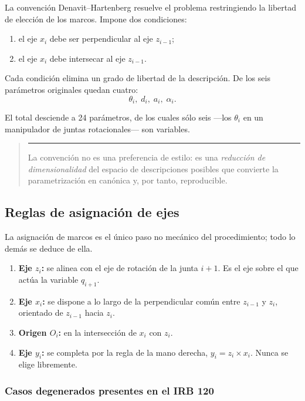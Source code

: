 \documentclass[11pt,a4paper]{article}
\newenvironment{nota}
  {\begin{quote}\small\color{oscuro}\rule{2pt}{\baselineskip}\hspace{6pt}\ignorespaces}
  {\end{quote}}
\begin{document}
La convención Denavit--Hartenberg resuelve el problema restringiendo la
libertad de elección de los marcos. Impone dos condiciones:

\begin{enumerate}[label=(\roman*),leftmargin=*]
\item el eje $x_i$ debe ser perpendicular al eje $z_{i-1}$;
\item el eje $x_i$ debe intersecar al eje $z_{i-1}$.
\end{enumerate}

Cada condición elimina un grado de libertad de la descripción. De los
seis parámetros originales quedan cuatro:
\begin{equation}
\theta_i,\; d_i,\; a_i,\; \alpha_i.
\end{equation}

El total desciende a 24 parámetros, de los cuales sólo seis —los
$\theta_i$ en un manipulador de juntas rotacionales— son variables.

\begin{nota}
La convención no es una preferencia de estilo: es una \emph{reducción de
dimensionalidad} del espacio de descripciones posibles que convierte la
parametrización en canónica y, por tanto, reproducible.
\end{nota}

\subsection{Reglas de asignación de ejes}

La asignación de marcos es el único paso no mecánico del procedimiento;
todo lo demás se deduce de ella.

\begin{enumerate}[label=\textbf{R\arabic*.},leftmargin=*]
\item \textbf{Eje $z_i$:} se alinea con el eje de rotación de la junta
      $i+1$. Es el eje sobre el que actúa la variable $q_{i+1}$.
\item \textbf{Eje $x_i$:} se dispone a lo largo de la perpendicular
      común entre $z_{i-1}$ y $z_i$, orientado de $z_{i-1}$ hacia $z_i$.
\item \textbf{Origen $O_i$:} en la intersección de $x_i$ con $z_i$.
\item \textbf{Eje $y_i$:} se completa por la regla de la mano derecha,
      $y_i = z_i \times x_i$. Nunca se elige libremente.
\end{enumerate}

\subsubsection*{Casos degenerados presentes en el IRB 120}
\end{document}
